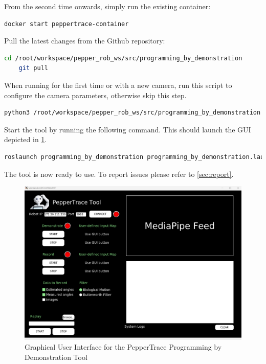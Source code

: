 \documentclass{CSSRforAfrica}
\begin{document}
\begin{description}
        From the second time onwards, simply run the existing container:
        \begin{lstlisting}[style=withoutNumbering, language=bash]
    docker start peppertrace-container
        \end{lstlisting}
        
    \item[Step 4:] Pull the latest changes from the Github repository:
        \begin{lstlisting}[style=withoutNumbering, language=bash]
    cd /root/workspace/pepper_rob_ws/src/programming_by_demonstration 
    git pull
        \end{lstlisting}
        
    \item[Step 5:] When running for the first time or with a new camera, run this script to configure the camera parameters, otherwise skip this step.
        \begin{lstlisting}[style=withoutNumbering, language=bash]
    python3 /root/workspace/pepper_rob_ws/src/programming_by_demonstration skeletal_model/config/set_camera_intrinsics.py
        \end{lstlisting}
        
    \item[Step 6:] Start the tool by running the following command. This should launch the GUI depicted in \cref{fig:gui}. 
        \begin{lstlisting}[style=withoutNumbering, language=bash]
    roslaunch programming_by_demonstration programming_by_demonstration.launch
        \end{lstlisting}
    
\end{description}
    
The tool is now ready to use. To report issues please refer to \cref{sec:report}.

\begin{figure}[htb]
    \centering
    \includegraphics[width=\linewidth]{figures/peppertrace_gui.png}
    \caption{Graphical User Interface for the PepperTrace Programming by Demonstration Tool}
    \label{fig:gui}
\end{figure}
    
\end{document}
